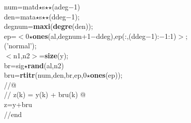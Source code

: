 {\begin{flushleft}
{\cmarg num=matd$\star$s$\star$$\star$(adeg$-$1)\\ 
\cmarg den=mata$\star$s$\star$$\star$(ddeg$-$1);\\ 
\cmarg degnum={\bf maxi}({\bf degre}(den));\\ 
\cmarg ep=$<$0$\star${\bf ones}(al,degnum+1$-$ddeg),ep(:,(ddeg$-$1):$-$1:1)$>$;\\ 
('normal');\\ 
\cmarg $<$n1,n2$>$={\bf size}(y);\\ 
\cmarg br=sig$\star${\bf rand}(al,n2)\\ 
\cmarg bru={\bf rtitr}(num,den,br,ep,0$\star${\bf ones}(ep));\\ 
\cmarg \verb@//@\\ 
\cmarg \verb@// z(k) = y(k) + bru(k) @\\ 
\cmarg z=y+bru\\ 
\cmarg //end }
\end{flushleft}}



